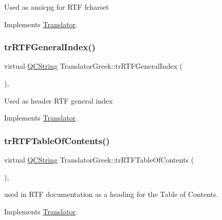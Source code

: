 Used as ansicpg for R\+TF fcharset 

Implements \mbox{\hyperlink{class_translator_afad391f3cbfb5ce6332b7239f8e2049a}{Translator}}.

\mbox{\label{class_translator_greek_a638872784be97651695123fba852387e}} 
\subsubsection{\texorpdfstring{trRTFGeneralIndex()}{trRTFGeneralIndex()}}
{\footnotesize\ttfamily virtual \mbox{\hyperlink{class_q_c_string}{Q\+C\+String}} Translator\+Greek\+::tr\+R\+T\+F\+General\+Index (\begin{DoxyParamCaption}{ }\end{DoxyParamCaption})\hspace{0.3cm}{\ttfamily [inline]}, {\ttfamily [virtual]}}

Used as header R\+TF general index 

Implements \mbox{\hyperlink{class_translator}{Translator}}.

\mbox{\label{class_translator_greek_ae2fa69fe45a2c3625163018619f9ae44}} 
\subsubsection{\texorpdfstring{trRTFTableOfContents()}{trRTFTableOfContents()}}
{\footnotesize\ttfamily virtual \mbox{\hyperlink{class_q_c_string}{Q\+C\+String}} Translator\+Greek\+::tr\+R\+T\+F\+Table\+Of\+Contents (\begin{DoxyParamCaption}{ }\end{DoxyParamCaption})\hspace{0.3cm}{\ttfamily [inline]}, {\ttfamily [virtual]}}

used in R\+TF documentation as a heading for the Table of Contents. 

Implements \mbox{\hyperlink{class_translator}{Translator}}.

\mbox{\label{class_translator_greek_ad1b7dd119aac742f95d86e9af19664e7}} 
